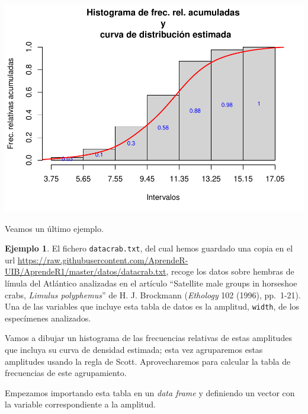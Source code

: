 \documentclass[
]{book}
\newenvironment{Shaded}{\begin{snugshade}}{\end{snugshade}}
\newcommand{\CommentTok}[1]{\textcolor[rgb]{0.56,0.35,0.01}{\textit{#1}}}
\newcommand{\DataTypeTok}[1]{\textcolor[rgb]{0.13,0.29,0.53}{#1}}
\newcommand{\KeywordTok}[1]{\textcolor[rgb]{0.13,0.29,0.53}{\textbf{#1}}}
\newcommand{\NormalTok}[1]{#1}
\newcommand{\OperatorTok}[1]{\textcolor[rgb]{0.81,0.36,0.00}{\textbf{#1}}}
\newcommand{\OtherTok}[1]{\textcolor[rgb]{0.56,0.35,0.01}{#1}}
\newcommand{\StringTok}[1]{\textcolor[rgb]{0.31,0.60,0.02}{#1}}
\theoremstyle{definition}
\theoremstyle{definition}
\newtheorem{example}{Ejemplo}[chapter]
\theoremstyle{definition}
\theoremstyle{remark}
\begin{document}
\begin{center}\includegraphics[width=0.9\linewidth]{13chap13_Agrupados_files/figure-latex/unnamed-chunk-88-2} \end{center}

Veamos un último ejemplo.

\begin{example}
\protect\hypertarget{exm:crab}{}{\label{exm:crab} }El fichero \texttt{datacrab.txt}, del cual hemos guardado una copia en el url \url{https://raw.githubusercontent.com/AprendeR-UIB/AprendeR1/master/datos/datacrab.txt}, recoge los datos sobre hembras de límula del Atlántico analizadas en el artículo ``Satellite male groups in horseshoe crabs, \emph{Limulus polyphemus}'' de H. J. Brockmann (\emph{Ethology} 102 (1996), pp.~1-21). Una de las variables que incluye esta tabla de datos es la amplitud, \texttt{width}, de los especímenes analizados.
\end{example}

Vamos a dibujar un histograma de las frecuencias relativas de estas amplitudes que incluya su curva de densidad estimada; esta vez agruparemos estas amplitudes usando la regla de Scott. Aprovecharemos para calcular la tabla de frecuencias de este agrupamiento.

Empezamos importando esta tabla en un \emph{data frame} y definiendo un vector con la variable correspondiente a la amplitud.

\begin{Shaded}
\end{Shaded}
\end{document}
